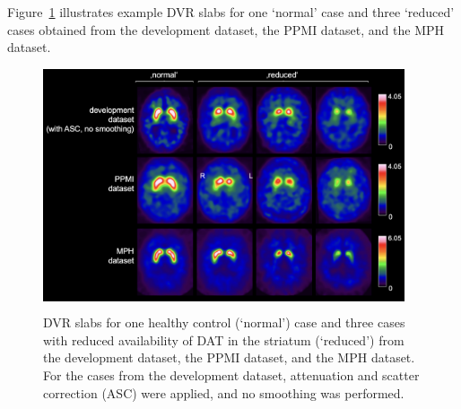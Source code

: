Figure~\ref{fig:datasets_samples} illustrates example DVR slabs for one `normal' case and three `reduced' cases obtained
from the development dataset, the PPMI dataset, and the MPH dataset.

\begin{figure}[t]
    \centering
    \colorbox{black}{%
     \includegraphics[width=0.95\textwidth]{content/figures/datasets_samples.png}%
     }
    \caption{DVR slabs for one healthy control (`normal') case 
    and three cases with reduced availability of DAT in the striatum (`reduced')
    from the development dataset, the PPMI dataset, and the MPH dataset.
    For the cases from the development dataset, attenuation and scatter correction (ASC) were applied, 
    and no smoothing was performed.} 
    \label{fig:datasets_samples}
\end{figure}
